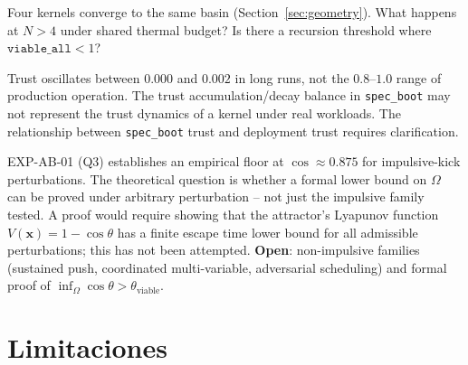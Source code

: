 \documentclass[11pt, a4paper]{article}
\begin{document}
\begin{description}[itemsep=0.55em]
  \item[Q5 -- Multi-kernel attractor interaction]
    Four kernels converge to the same basin (Section~\ref{sec:geometry}).
    What happens at $N > 4$ under shared thermal budget?
    Is there a recursion threshold where $\texttt{viable\_all} < 1$?

  \item[Q6 -- Trust dynamics]
    Trust oscillates between $0.000$ and $0.002$ in long runs,
    not the $0.8$--$1.0$ range of production operation.
    The trust accumulation/decay balance in \texttt{spec\_boot} may not
    represent the trust dynamics of a kernel under real workloads.
    The relationship between \texttt{spec\_boot} trust and deployment
    trust requires clarification.

  \item[Q7 -- $L_3$ reachability: formal lower limit on $\Omega$]
    EXP-AB-01 (Q3) establishes an empirical floor at $\cos \approx 0.875$
    for impulsive-kick perturbations.
    The theoretical question is whether a formal lower bound on $\Omega$
    can be proved under arbitrary perturbation -- not just the
    impulsive family tested.
    A proof would require showing that the attractor's Lyapunov function
    $V(\mathbf{x}) = 1 - \cos\theta$ has a finite escape time lower bound
    for all admissible perturbations; this has not been attempted.
    \textbf{Open}: non-impulsive families (sustained push, coordinated
    multi-variable, adversarial scheduling) and formal proof of
    $\inf_\Omega \cos\theta > \theta_\text{viable}$.

\end{description}


\section{Limitaciones}
\label{sec:limitations}
\end{document}
